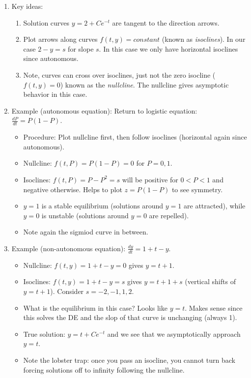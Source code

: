 \documentclass{article}
\newcommand{\ds}{\displaystyle}
\begin{document}
\begin{enumerate}
\begin{enumerate}
\item Key ideas:
\begin{enumerate}
\item Solution curves $y=2+Ce^{-t}$ are tangent to the direction arrows.
\item Plot arrows along curves $f(t,y)=constant$ (known as \emph{isoclines}). In our case $2-y=s$ for slope $s$. In this case we only have horizontal isoclines since autonomous. 
\item Note, curves can cross over isoclines, just not the zero isocline ($f(t,y)=0$) known as the \emph{nullcline}. The nullcline gives asymptotic behavior in this case.
\end{enumerate}

\item Example (autonomous equation): Return to logistic equation: $\ds \frac{dP}{dt} = P(1-P)$. 
\begin{itemize}
\item Procedure: Plot nullcline first, then follow isoclines (horizontal again since autonomous).
\item Nullcline: $f(t,P)=P(1-P)=0$ for $P=0,1$. 
\item Isoclines: $f(t,P)=P-P^2=s$ will be positive for $0<P<1$ and negative otherwise. Helps to plot $z=P(1-P)$ to see symmetry.
\item $y=1$ is a stable equilibrium (solutions around $y=1$ are attracted), while $y=0$ is unstable (solutions around $y=0$ are repelled). 
\item Note again the sigmiod curve in between.
\end{itemize}


\item Example (non-autonomous equation): $\ds \frac{dy}{dt}=1+t-y$.
\begin{itemize}
\item Nullcline: $f(t,y)=1+t-y=0$ gives $y=t+1$.
\item Isoclines: $f(t,y)=1+t-y=s$ gives $y=t+1+s$ (vertical shifts of $y=t+1$). Consider $s=-2,-1,1,2$. 
\item What is the equilibrium in this case? Looks like $y=t$. Makes sense since this solves the DE and the slop of that curve is unchanging (always 1). 
\item True solution: $y=t+Ce^{-t}$ and we see that we asymptotically approach $y=t$.
\item Note the lobster trap: once you pass an isocline, you cannot turn back forcing solutions off to infinity following the nullcline.
\end{itemize}


\end{enumerate}
\end{enumerate}
\end{document}
